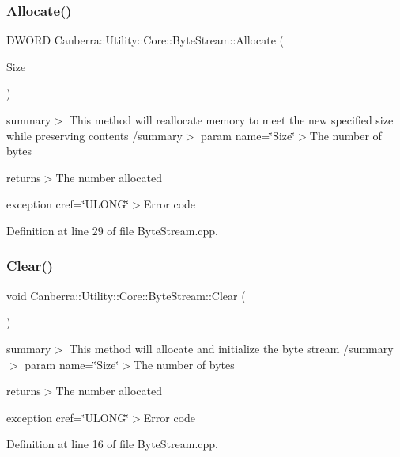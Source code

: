 \subsubsection{\texorpdfstring{Allocate()}{Allocate()}}
{\footnotesize\ttfamily D\+W\+O\+RD Canberra\+::\+Utility\+::\+Core\+::\+Byte\+Stream\+::\+Allocate (\begin{DoxyParamCaption}\item[{D\+W\+O\+RD}]{Size }\end{DoxyParamCaption})}

summary$>$ This method will reallocate memory to meet the new specified size while preserving contents /summary$>$ param name=\char`\"{}\+Size\char`\"{}$>$The number of bytes

returns$>$The number allocated

exception cref=\char`\"{}\+U\+L\+O\+N\+G\char`\"{}$>$Error code

Definition at line 29 of file Byte\+Stream.\+cpp.

\mbox{\label{class_canberra_1_1_utility_1_1_core_1_1_byte_stream_af771098ca049f3e53ddc7b2afaebc2dc_af771098ca049f3e53ddc7b2afaebc2dc}} 
\subsubsection{\texorpdfstring{Clear()}{Clear()}}
{\footnotesize\ttfamily void Canberra\+::\+Utility\+::\+Core\+::\+Byte\+Stream\+::\+Clear (\begin{DoxyParamCaption}\item[{void}]{ }\end{DoxyParamCaption})}

summary$>$ This method will allocate and initialize the byte stream /summary$>$ param name=\char`\"{}\+Size\char`\"{}$>$The number of bytes

returns$>$The number allocated

exception cref=\char`\"{}\+U\+L\+O\+N\+G\char`\"{}$>$Error code

Definition at line 16 of file Byte\+Stream.\+cpp.

\mbox{\label{class_canberra_1_1_utility_1_1_core_1_1_byte_stream_ac997ccc2337609abf0765ce17d474d22_ac997ccc2337609abf0765ce17d474d22}} 
